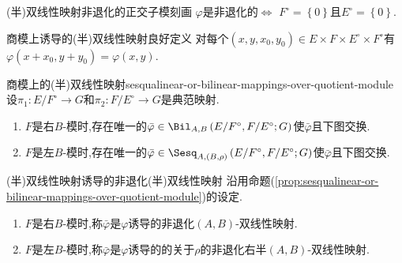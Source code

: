 \begin{proposition}{(半)双线性映射非退化的正交子模刻画}{}
	$\varphi$是非退化的$\iff$ $F^{\circ}=\left\{0\right\}$且$E^{\circ}=\left\{0\right\}$.
\end{proposition}

\begin{lemma}{商模上诱导的(半)双线性映射良好定义}{}
	对每个$\left(x,y,x_{0},y_{0}\right)\in E\times F\times E^{\circ}\times F^{\circ}$有$\varphi\left(x+x_{0},y+y_{0}\right)=\varphi\left(x,y\right)$.
\end{lemma}

\begin{proposition}{商模上的(半)双线性映射}{sesqualinear-or-bilinear-mappings-over-quotient-module}
	设$\pi_{1}:E/F^{\circ}\to G$和$\pi_{2}:F/E^{\circ}\to G$是典范映射.
	\begin{enumerate}
		\item $F$是右$B$-模时,存在唯一的$\bar{\varphi}\in\Bil_{A,B}\left(E/F^{\circ},F/E^{\circ};G\right)$使$\bar{\varphi}$且下图交换.
		\begin{center}
		\end{center}
		\item $F$是左$B$-模时,存在唯一的$\bar{\varphi}\in\Sesq_{A,(B,\rho)}\left(E/F^{\circ},F/E^{\circ};G\right)$使$\bar{\varphi}$且下图交换.
		\begin{center}
		\end{center}
	\end{enumerate}
\end{proposition}

\begin{definition}{(半)双线性映射诱导的非退化(半)双线性映射}{}
	沿用命题(\cref{prop:sesqualinear-or-bilinear-mappings-over-quotient-module})的设定.
	\begin{enumerate}
		\item $F$是右$B$-模时,称$\bar{\varphi}$是$\varphi$诱导的非退化$\left(A,B\right)$-双线性映射.
		\item $F$是左$B$-模时,称$\bar{\varphi}$是$\varphi$诱导的的关于$\rho$的非退化右半$\left(A,B\right)$-双线性映射.
	\end{enumerate}
\end{definition}

